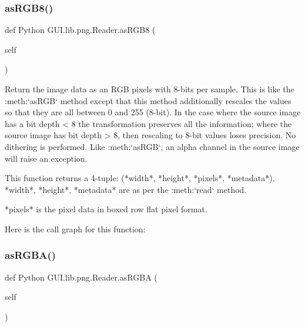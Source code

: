 \subsubsection{\texorpdfstring{as\+R\+G\+B8()}{asRGB8()}}
{\footnotesize\ttfamily def Python G\+U\+I.\+lib.\+png.\+Reader.\+as\+R\+G\+B8 (\begin{DoxyParamCaption}\item[{}]{self }\end{DoxyParamCaption})}

\begin{DoxyVerb}Return the image data as an RGB pixels with 8-bits per
sample.  This is like the :meth:`asRGB` method except that
this method additionally rescales the values so that they
are all between 0 and 255 (8-bit).  In the case where the
source image has a bit depth < 8 the transformation preserves
all the information; where the source image has bit depth
> 8, then rescaling to 8-bit values loses precision.  No
dithering is performed.  Like :meth:`asRGB`, an alpha channel
in the source image will raise an exception.

This function returns a 4-tuple:
(*width*, *height*, *pixels*, *metadata*).
*width*, *height*, *metadata* are as per the
:meth:`read` method.

*pixels* is the pixel data in boxed row flat pixel format.
\end{DoxyVerb}
 Here is the call graph for this function\+:
\mbox{\label{class_python_01_g_u_i_1_1lib_1_1png_1_1_reader_a36f25debee916a65db83796ceee97d82}} 
\subsubsection{\texorpdfstring{as\+R\+G\+B\+A()}{asRGBA()}}
{\footnotesize\ttfamily def Python G\+U\+I.\+lib.\+png.\+Reader.\+as\+R\+G\+BA (\begin{DoxyParamCaption}\item[{}]{self }\end{DoxyParamCaption})}

